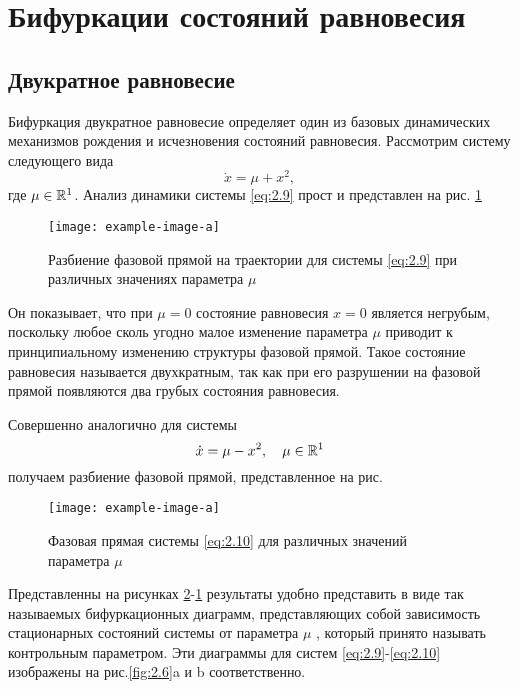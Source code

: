 \section{Бифуркации состояний равновесия} %
\subsection{Двукратное равновесие}

Бифуркация двукратное равновесие определяет один из базовых динамических механизмов рождения и исчезновения состояний равновесия. Рассмотрим систему следующего вида
\begin{equation}
	\label{eq:2.9}
	\dot x = \mu  + x^2,	
\end{equation}
где $\mu \in \mathbb{R}^1$. Анализ динамики системы \eqref{eq:2.9} прост и представлен на рис. \ref{fig:2.4}
\begin{figure}[h!]
	\centering
	\texttt{[image: example-image-a]}
	\caption{Разбиение фазовой прямой на траектории для системы \eqref{eq:2.9} при различных значениях параметра $\mu$}	
	\label{fig:2.4}	
\end{figure}
Он показывает, что при $\mu =0 $ состояние равновесия $x=0$ является негрубым, поскольку любое сколь угодно малое изменение параметра $\mu$ приводит к принципиальному изменению структуры фазовой прямой. Такое состояние равновесия называется двухкратным, так как при его разрушении на фазовой прямой появляются два грубых состояния равновесия. 

Совершенно аналогично для системы
\begin{equation}
	\label{eq:2.10}
	\dot x= \mu - x^2, \quad \mu \in \mathbb{R}^1	
\end{equation}
получаем разбиение фазовой прямой, представленное на рис.
\begin{figure}[h!]
 	\centering
 	\texttt{[image: example-image-a]}
 	\caption{Фазовая прямая системы \eqref{eq:2.10} для различных значений параметра $\mu$ }
 	\label{fig:2.5}
 \end{figure} 

 Представленны на рисунках \ref{fig:2.5}-\ref{fig:2.4} результаты удобно представить в виде так называемых бифуркационных диаграмм, представляющих собой зависимость стационарных состояний системы от параметра $\mu$ , который принято называть контрольным параметром. Эти диаграммы для систем \eqref{eq:2.9}-\eqref{eq:2.10} изображены на рис.\ref{fig:2.6}a и b соответственно.

